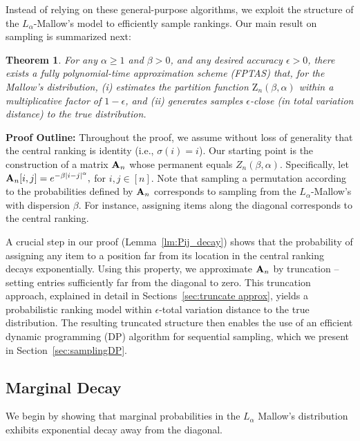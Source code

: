 \documentclass{article}
\newcommand{\bA}{\bold{A}}
\renewcommand{\P}{\mathbb{P}}
\newcommand{\Z}{\mathrm{Z}}
\newtheorem{theorem}{Theorem}[section] %
\begin{document}
Instead of relying on these general-purpose algorithms, we exploit the structure of the  $L_\alpha$-Mallow's model to efficiently sample rankings. 
Our main result on sampling is summarized next:
\begin{theorem}\label{thm:main sampling}
For any \( \alpha \geq 1 \) and \( \beta > 0 \), and any desired accuracy \( \epsilon > 0 \), there exists a fully polynomial-time approximation scheme (FPTAS) that, for the Mallow's distribution, (i)  estimates the partition function \( \Z_n(\beta, \alpha) \) within a multiplicative factor of \( 1 - \epsilon \), and (ii) generates samples $\epsilon$-close (in total variation distance) to the true distribution.
\end{theorem}

\textbf{Proof Outline:}
Throughout the proof, we assume without loss of generality that the central ranking is identity (i.e., $\sigma(i)=i$).
 Our starting point is the construction of a matrix \( {\bA}_n \) whose permanent equals \( Z_n(\beta, \alpha) \). Specifically, let 
${\bA}_n[i, j] = e^{-\beta |i - j|^\alpha},$
for \( i, j \in [n] \).
Note that sampling a permutation according to the probabilities defined by ${\bA}_n$ corresponds to sampling from the $L_\alpha$-Mallow's with dispersion $\beta$. For instance, assigning items  along the diagonal corresponds to the central ranking.

A crucial step in our proof (Lemma~\ref{lm:Pij_decay}) shows that the probability of assigning any item to a position far from its location in the central ranking decays exponentially.
Using this property, we approximate ${\bA}_n$ by truncation -- setting entries sufficiently far from the diagonal to zero. This truncation approach,  explained in detail in Sections~\ref{sec:truncate approx}, yields a probabilistic ranking model within $\epsilon$-total variation distance to the true distribution.  The resulting truncated structure then enables the use of an efficient dynamic programming (DP) algorithm for sequential sampling, which we present in Section~\ref{sec:samplingDP}.  


\subsection{Marginal Decay}\label{sec:decay}
We begin by showing that marginal probabilities in the  $L_\alpha$
Mallow's distribution exhibits exponential decay away from the diagonal.
 
\end{document}
